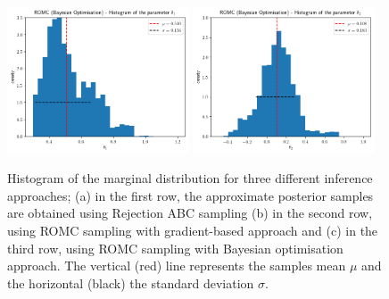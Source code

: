 \begin{figure}[h]
\begin{center}
      \includegraphics[width=0.48\textwidth]{./Thesis/images/chapter4/mae2_hist_t1_romc_bo.png}
      \includegraphics[width=0.48\textwidth]{./Thesis/images/chapter4/mae2_hist_t2_romc_bo.png}\\
    \end{center}
  \caption{Histogram of the marginal distribution for three different inference approaches; (a) in the first row, the approximate posterior samples are obtained using Rejection ABC sampling (b) in the second row, using ROMC sampling with gradient-based approach and (c) in the third row, using ROMC sampling with Bayesian optimisation approach. The vertical (red) line represents the samples mean $\mu$ and the horizontal (black) the standard deviation $\sigma$.}
  \label{fig:ma2_3}
\end{figure}


